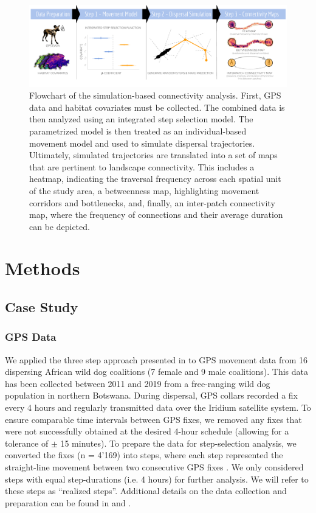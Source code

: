 \documentclass[abstract=on,10pt,a4paper,bibliography=totocnumbered]{article}
\begin{document}
\begin{figure}[htbp]
  \begin{center}
    \includegraphics[width = \textwidth]{99_GraphicalAbstract.pdf}
    \caption{Flowchart of the simulation-based connectivity analysis. First, GPS
    data and habitat covariates must be collected. The combined data is then
    analyzed using an integrated step selection model. The parametrized model is
    then treated as an individual-based movement model and used to simulate
    dispersal trajectories. Ultimately, simulated trajectories are translated
    into a set of maps that are pertinent to landscape connectivity. This
    includes a heatmap, indicating the traversal frequency across each spatial
    unit of the study area, a betweenness map, highlighting movement corridors
    and bottlenecks, and, finally, an inter-patch connectivity map, where the
    frequency of connections and their average duration can be depicted.}
    \label{GraphicalAbstract}
  \end{center}
\end{figure}

\section{Methods}
\subsection{Case Study}
\subsubsection{GPS Data}
We applied the three step approach presented in  to GPS
movement data from 16 dispersing African wild dog coalitions (7 female and 9
male coalitions). This data has been collected between 2011 and 2019 from a
free-ranging wild dog population in northern Botswana. During dispersal, GPS
collars recorded a fix every 4 hours and regularly transmitted data over the
Iridium satellite system. To ensure comparable time intervals between GPS fixes,
we removed any fixes that were not successfully obtained at the desired 4-hour
schedule (allowing for a tolerance of \( \pm \) 15 minutes). To prepare the data
for step-selection analysis, we converted the fixes (n = 4'169) into steps,
where each step represented the straight-line movement between two consecutive
GPS fixes \citep{Turchin.1998}. We only considered steps with equal
step-durations (i.e. 4 hours) for further analysis. We will refer to these steps
as ``realized steps''. Additional details on the data collection and preparation
can be found in \cite{Cozzi.2020} and \cite{Hofmann.2021}.
\end{document}
